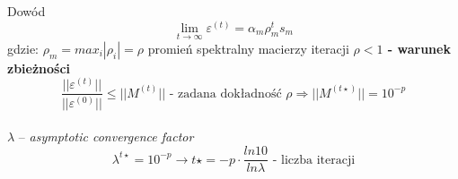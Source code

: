 \begin{frame}{}
  \begin{block}{Dowód}
    \[\lim_{t\to\infty} \varepsilon^{(t)} = \alpha _m \rho _m^t s_m\]
    gdzie: $\rho _m = max_i |\rho _i|= \rho$ promień spektralny macierzy iteracji
    \center \textbf{$\rho < 1$ - warunek zbieżności}
    $$ \frac{||\varepsilon^{(t)}||}{||\varepsilon^{(0)}||} \leq ||M^{(t)}|| \text{ - zadana dokładność } \rho\Rightarrow ||M^{(t\star)}|| = 10^{-p}$$   %
    \\$\lambda$ -- \emph{asymptotic convergence factor}
    \[\lambda^{t\star}=10^{-p} \rightarrow t\star = -p \cdot  \frac{ln 10}{ln \lambda} \text{ - liczba iteracji}\]    %
  \end{block}
\end{frame}
